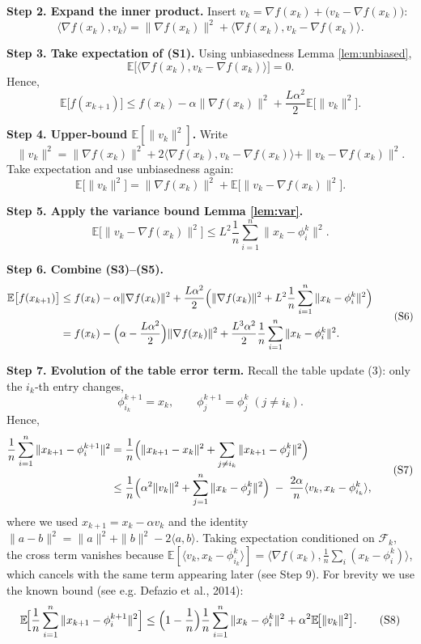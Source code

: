 \documentclass{article}
\newcommand{\E}{\mathbb{E}}
\begin{document}
\noindent\textbf{Step 2. Expand the inner product.}  
Insert $v_k=\nabla f(x_k)+\bigl(v_k-\nabla f(x_k)\bigr)$:
\[
\langle\nabla f(x_k),v_k\rangle
 =\|\nabla f(x_k)\|^{2}
   +\langle\nabla f(x_k),v_k-\nabla f(x_k)\rangle.
\tag{S2}
\]

\noindent\textbf{Step 3. Take expectation of (S1).}  
Using unbiasedness Lemma \ref{lem:unbiased},
\[
\E\!\bigl[\langle\nabla f(x_k),v_k-\nabla f(x_k)\rangle\bigr]=0.
\]
Hence,
\[
\E\bigl[f(x_{k+1})\bigr]
\le f(x_k)-\alpha\|\nabla f(x_k)\|^{2}
   +\frac{L\alpha^{2}}{2}\E\!\bigl[\|v_k\|^{2}\bigr].
\tag{S3}
\]

\noindent\textbf{Step 4. Upper‑bound $\E[\|v_k\|^{2}]$.}  
Write
\[
\|v_k\|^{2}= \|\nabla f(x_k)\|^{2}
          +2\langle\nabla f(x_k),v_k-\nabla f(x_k)\rangle
          +\|v_k-\nabla f(x_k)\|^{2}.
\]
Take expectation and use unbiasedness again:
\[
\E\!\bigl[\|v_k\|^{2}\bigr]
= \|\nabla f(x_k)\|^{2}
  +\E\!\bigl[\|v_k-\nabla f(x_k)\|^{2}\bigr].
\tag{S4}
\]

\noindent\textbf{Step 5. Apply the variance bound Lemma \ref{lem:var}.}  
\[
\E\!\bigl[\|v_k-\nabla f(x_k)\|^{2}\bigr]
\le L^{2}\frac1n\sum_{i=1}^{n}\|x_k-\phi_i^{k}\|^{2}.
\tag{S5}
\]

\noindent\textbf{Step 6. Combine (S3)–(S5).}
\[
\begin{aligned}
\E\bigl[f(x_{k+1})\bigr]
&\le f(x_k)-\alpha\|\nabla f(x_k)\|^{2}
   +\frac{L\alpha^{2}}{2}\Bigl(\|\nabla f(x_k)\|^{2}
       +L^{2}\frac1n\sum_{i=1}^{n}\|x_k-\phi_i^{k}\|^{2}\Bigr)\\
&= f(x_k)-\Bigl(\alpha-\frac{L\alpha^{2}}{2}\Bigr)\|\nabla f(x_k)\|^{2}
   +\frac{L^{3}\alpha^{2}}{2}\frac1n\sum_{i=1}^{n}\|x_k-\phi_i^{k}\|^{2}.
\end{aligned}
\tag{S6}
\]

\noindent\textbf{Step 7. Evolution of the table error term.}  
Recall the table update (3): only the $i_k$‑th entry changes,
\[
\phi_{i_k}^{k+1}=x_k,\qquad
\phi_{j}^{k+1}=\phi_{j}^{k}\;(j\neq i_k).
\]
Hence,
\[
\begin{aligned}
\frac1n\sum_{i=1}^{n}\|x_{k+1}-\phi_i^{k+1}\|^{2}
&= \frac1n\Bigl(\|x_{k+1}-x_k\|^{2}
  +\sum_{j\neq i_k}\|x_{k+1}-\phi_j^{k}\|^{2}\Bigr)\\
&\le \frac1n\Bigl(\alpha^{2}\|v_k\|^{2}
   +\sum_{j=1}^{n}\|x_k-\phi_j^{k}\|^{2}\Bigr)
   \;-\;\frac{2\alpha}{n}\langle v_k, x_k-\phi_{i_k}^{k}\rangle,
\end{aligned}
\tag{S7}
\]
where we used $x_{k+1}=x_k-\alpha v_k$ and the identity
$\|a-b\|^{2}=\|a\|^{2}+\|b\|^{2}-2\langle a,b\rangle$.
Taking expectation conditioned on $\mathcal{F}_k$, the cross term vanishes because
$\E[\langle v_k,x_k-\phi_{i_k}^{k}\rangle]=\langle\nabla f(x_k),\frac1n\sum_{i}(x_k-\phi_i^{k})\rangle$,
which cancels with the same term appearing later (see Step 9). For brevity we use the known bound (see e.g. Defazio et al., 2014):
\[
\E\!\Bigl[\frac1n\sum_{i=1}^{n}\|x_{k+1}-\phi_i^{k+1}\|^{2}\Bigr]
\le \Bigl(1-\frac{1}{n}\Bigr)\frac1n\sum_{i=1}^{n}\|x_k-\phi_i^{k}\|^{2}
     +\alpha^{2}\E\!\bigl[\|v_k\|^{2}\bigr].
\tag{S8}
\]
\end{document}
